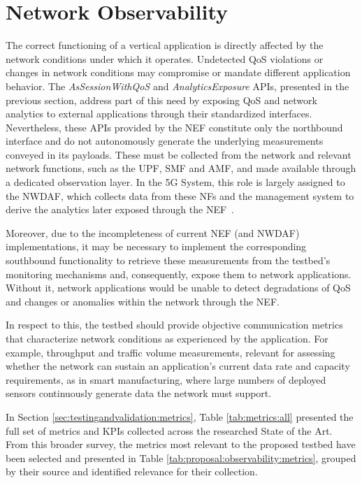 \section{Network Observability}
\label{chap:proposal:observability}

The correct functioning of a vertical application is directly affected by the network conditions under which it operates. Undetected \acs{QoS} violations or changes in network conditions may compromise or mandate different application behavior. The \textit{AsSessionWithQoS} and \textit{AnalyticsExposure} \acsp{API}, presented in the previous section, address part of this need by exposing \acs{QoS} and network analytics to external applications through their standardized interfaces. Nevertheless, these \acsp{API} provided by the \acs{NEF} constitute only the northbound interface and do not autonomously generate the underlying measurements conveyed in its payloads. These must be collected from the network and relevant network functions, such as the \acs{UPF}, \acs{SMF} and \acs{AMF}, and made available through a dedicated observation layer. In the \acs{5G} System, this role is largely assigned to the \acs{NWDAF}, which collects data from these \acsp{NF} and the management system to derive the analytics later exposed through the \acs{NEF}~\cite{ETSI_TS_123_288_V18_11_0}.

Moreover, due to the incompleteness of current \acs{NEF} (and \acs{NWDAF}) implementations, it may be necessary to implement the corresponding southbound functionality to retrieve these measurements from the testbed's monitoring mechanisms and, consequently, expose them to network applications. Without it, network applications would be unable to detect degradations of \acs{QoS} and changes or anomalies within the network through the \acs{NEF}.

In respect to this, the testbed should provide objective communication metrics that characterize network conditions as experienced by the application. For example, throughput and traffic volume measurements, relevant for assessing whether the network can sustain an application's current data rate and capacity requirements, as in smart manufacturing, where large numbers of deployed sensors continuously generate data the network must support.

In Section \ref{sec:testingandvalidation:metrics}, Table \ref{tab:metrics:all} presented the full set of metrics and \acsp{KPI} collected across the researched State of the Art. From this broader survey, the metrics most relevant to the proposed testbed have been selected and presented in Table \ref{tab:proposal:observability:metrics}, grouped by their source and identified relevance for their collection.

